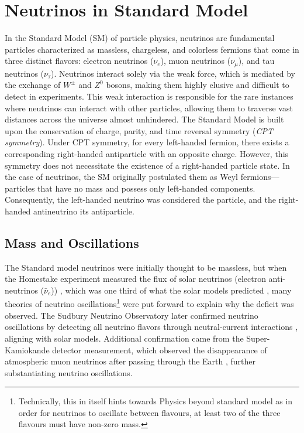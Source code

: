 \section{Neutrinos in Standard Model}
\label{sec:sm_nu}
In the Standard Model (SM) of particle physics, neutrinos are fundamental particles characterized as massless, chargeless, and colorless fermions that come in three distinct flavors: electron neutrinos ($\nu_e$), muon neutrinos ($\nu_\mu$), and tau neutrinos ($\nu_\tau$). Neutrinos interact solely via the weak force, which is mediated by the exchange of $W^\pm$ and $Z^0$ bosons, making them highly elusive and difficult to detect in experiments. This weak interaction is responsible for the rare instances where neutrinos can interact with other particles, allowing them to traverse vast distances across the universe almost unhindered. The Standard Model is built upon the conservation of charge, parity, and time reversal symmetry (\emph{CPT symmetry}). Under CPT symmetry, for every left-handed fermion, there exists a corresponding right-handed antiparticle with an opposite charge. However, this symmetry does not necessitate the existence of a right-handed particle state. In the case of neutrinos, the SM originally postulated them as Weyl fermions—particles that have no mass and possess only left-handed components. Consequently, the left-handed neutrino was considered the particle, and the right-handed antineutrino its antiparticle. 


\subsection{Mass and Oscillations}
\label{sec:nu_mass_osc}
The Standard model neutrinos were initially thought to be massless, but when the Homestake experiment measured the flux of solar neutrinos (electron anti-neutrinos ($\bar{\nu}_e$)) , which was one third of what the solar models predicted , many theories of neutrino oscillations\footnote{Technically, this in itself hints towards Physics beyond standard model as in order for neutrinos to oscillate between flavours, at least two of the three flavours must have non-zero mass.} were put forward to explain why the deficit was observed. The Sudbury Neutrino Observatory later confirmed neutrino oscillations by detecting all neutrino flavors through neutral-current interactions , aligning with solar models. Additional confirmation came from the Super-Kamiokande detector measurement, which observed the disappearance of atmospheric muon neutrinos after passing through the Earth , further substantiating neutrino oscillations. 

